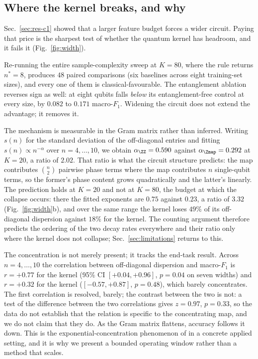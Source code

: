 \subsection{Where the kernel breaks, and why}
\label{sec:res-width}

\begin{revbody}


Sec.~\ref{sec:res-c1} showed that a larger feature budget forces a wider
circuit. Paying that price is the sharpest test of whether the quantum kernel
has headroom, and it fails it (Fig.~\ref{fig:width}).

Re-running the entire sample-complexity sweep at $K=80$, where the rule returns
$n^\ast=8$, produces $48$ paired comparisons (six baselines across eight
training-set sizes), and every one of them is classical-favourable. The
entanglement ablation reverses sign as well: at eight qubits \QSVM{} falls
\emph{below} its entanglement-free control at every size, by $0.082$ to $0.171$
macro-$F_1$. Widening the circuit does not extend the advantage; it removes it.

The mechanism is measurable in the Gram matrix rather than inferred. Writing
$s(n)$ for the standard deviation of the off-diagonal entries and fitting
$s(n)\propto n^{-\alpha}$ over $n=4,\dots,10$, we obtain $\alpha_{\ZZ}=0.590$
against $\alpha_{\Zmap}=0.292$ at $K=20$, a ratio of $2.02$. That ratio is
what the circuit structure predicts: the \ZZ{} map contributes
$\binom{n}{2}$ pairwise phase terms where the \Zmap{} map contributes $n$
single-qubit terms, so the former's phase content grows quadratically and the
latter's linearly. The prediction holds at $K=20$ and not at $K=80$, the budget
at which the collapse occurs: there the fitted exponents are $0.75$ against
$0.23$, a ratio of $3.32$ (Fig.~\ref{fig:width}b), and over the same range the
\ZZ{} kernel loses $49\%$ of its off-diagonal dispersion against $18\%$ for the
\Zmap{} kernel. The counting argument therefore predicts the ordering of the
two decay rates everywhere and their ratio only where the kernel does not
collapse; Sec.~\ref{sec:limitations} returns to this.

The concentration is not merely present; it tracks the end-task result. Across
$n=4,\dots,10$ the correlation between off-diagonal dispersion and macro-$F_1$
is $r=+0.77$ for the \ZZ{} kernel (95\% CI $[+0.04,+0.96]$, $p=0.04$ on seven
widths) and $r=+0.32$ for the \Zmap{} kernel ($[-0.57,+0.87]$, $p=0.48$), which
barely concentrates. The first correlation is resolved, barely; the contrast
between the two is not: a test of the difference between the two correlations
gives $z=0.97$, $p=0.33$, so the data do not establish that the relation is
specific to the concentrating map, and we do not claim that they do. As the Gram
matrix flattens, accuracy follows it down.
This is the exponential-concentration phenomenon of \cite{thanasilp2024} in a
concrete applied setting, and it is why we present a bounded operating window
rather than a method that scales.


\end{revbody}
